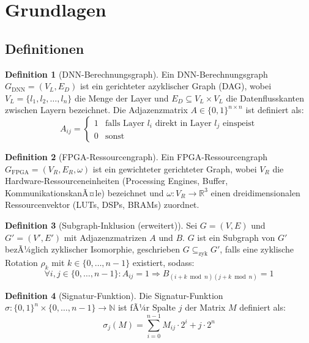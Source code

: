 ﻿\documentclass[a4paper,12pt]{article}
\theoremstyle{definition}
\newtheorem{definition}{Definition}
\begin{document}
\section{Grundlagen}
\label{sec:grundlagen}

\subsection{Definitionen}

\begin{definition}[DNN-Berechnungsgraph]
    Ein DNN-Berechnungsgraph $G_{\text{DNN}} = (V_L, E_D)$ ist ein gerichteter azyklischer
    Graph (DAG), wobei $V_L = \{l_1, l_2, \ldots, l_n\}$ die Menge der Layer und
    $E_D \subseteq V_L \times V_L$ die Datenflusskanten zwischen Layern bezeichnet.
    Die Adjazenzmatrix $A \in \{0,1\}^{n \times n}$ ist definiert als:
    \[
        A_{ij} = \begin{cases} 1 & \text{falls Layer } l_i \text{ direkt in Layer } l_j \text{ einspeist} \\ 0 & \text{sonst} \end{cases}
    \]
\end{definition}

\begin{definition}[FPGA-Ressourcengraph]
    Ein FPGA-Ressourcengraph $G_{\text{FPGA}} = (V_R, E_R, \omega)$ ist ein gewichteter
    gerichteter Graph, wobei $V_R$ die Hardware-Ressourceneinheiten (Processing Engines,
    Buffer, KommunikationskanÃ¤le) bezeichnet und $\omega: V_R \to \mathbb{R}^3$ einen
    dreidimensionalen Ressourcenvektor (LUTs, DSPs, BRAMs) zuordnet.
\end{definition}

\begin{definition}[Subgraph-Inklusion (erweitert)]
    Sei $G = (V, E)$ und $G' = (V', E')$ mit Adjazenzmatrizen $A$ und $B$.
    $G$ ist ein Subgraph von $G'$ bezÃ¼glich zyklischer Isomorphie, geschrieben
    $G \subseteq_{\text{zyk}} G'$, falls eine zyklische Rotation $\rho_k$ mit
    $k \in \{0, \ldots, n-1\}$ existiert, sodass:
    \[
        \forall i,j \in \{0,\ldots,n-1\}: A_{ij} = 1 \Rightarrow B_{(i+k \bmod n)(j+k \bmod n)} = 1
    \]
\end{definition}

\begin{definition}[Signatur-Funktion]
    Die Signatur-Funktion $\sigma: \{0,1\}^n \times \{0,\ldots,n-1\} \to \mathbb{N}$
    ist fÃ¼r Spalte $j$ der Matrix $M$ definiert als:
    \[
        \sigma_j(M) = \sum_{i=0}^{n-1} M_{ij} \cdot 2^i + j \cdot 2^n
    \]
\end{definition}
\end{document}
